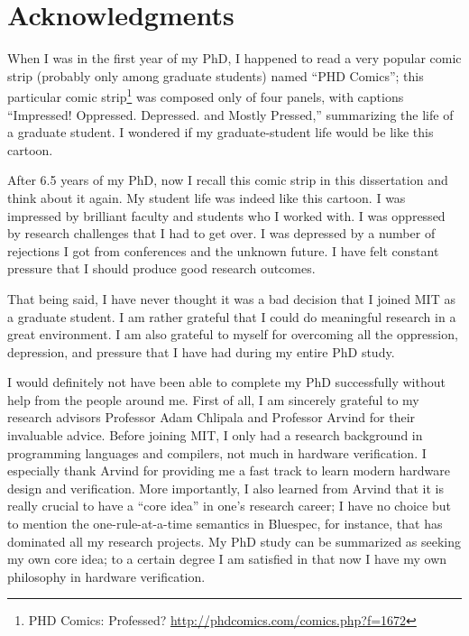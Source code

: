 % 

\cleardoublepage

\section*{Acknowledgments}

\begin{singlespace}
When I was in the first year of my PhD, I happened to read a very popular comic strip (probably only among graduate students) named ``PHD Comics''; this particular comic strip\footnote{PHD Comics: Professed? \url{http://phdcomics.com/comics.php?f=1672}} was composed only of four panels, with captions ``Impressed! Oppressed. Depressed. and Mostly Pressed,'' summarizing the life of a graduate student.
I wondered if my graduate-student life would be like this cartoon.

After 6.5 years of my PhD, now I recall this comic strip in this dissertation and think about it again.
My student life was indeed like this cartoon.
I was impressed by brilliant faculty and students who I worked with.
I was oppressed by research challenges that I had to get over.
I was depressed by a number of rejections I got from conferences and the unknown future.
I have felt constant pressure that I should produce good research outcomes.

That being said, I have never thought it was a bad decision that I joined MIT as a graduate student.
I am rather grateful that I could do meaningful research in a great environment.
I am also grateful to myself for overcoming all the oppression, depression, and pressure that I have had during my entire PhD study.

I would definitely not have been able to complete my PhD successfully without help from the people around me.
First of all, I am sincerely grateful to my research advisors Professor Adam Chlipala and Professor Arvind for their invaluable advice.
Before joining MIT, I only had a research background in programming languages and compilers, not much in hardware verification.
I especially thank Arvind for providing me a fast track to learn modern hardware design and verification.
More importantly, I also learned from Arvind that it is really crucial to have a ``core idea'' in one's research career; I have no choice but to mention the one-rule-at-a-time semantics in Bluespec, for instance, that has dominated all my research projects.
My PhD study can be summarized as seeking my own core idea; to a certain degree I am satisfied in that now I have my own philosophy in hardware verification.


\end{singlespace}
